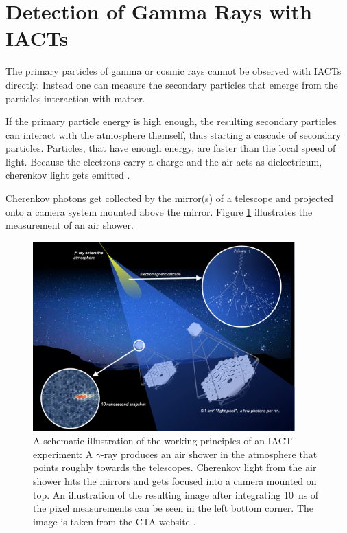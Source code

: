 \section{Detection of Gamma Rays with IACTs}
\label{sec:measuring}

The primary particles of gamma or cosmic rays cannot be 
observed with IACTs directly. Instead one can measure the secondary particles
that emerge from the particles interaction with matter.

If the primary particle energy is high enough, the resulting 
secondary particles can interact with the atmosphere themself, thus starting a 
cascade of secondary particles.
Particles, that have enough energy, are faster than the local speed of light.
Because the electrons carry a charge and the air acts as dielectricum, 
cherenkov light gets emitted \cite{quelle suchen}.

Cherenkov photons get collected by the mirror(s) of a telescope
and projected onto a camera system mounted above the mirror.
Figure \ref{fig:iact_mirror_camera} illustrates the measurement of 
an air shower.

\begin{figure}
	\centering
	\captionsetup{width=0.9\linewidth}
	\includegraphics[width=0.9\textwidth]{images/cta47.png}
	\caption{A schematic illustration of the working principles of 
	an IACT experiment:
	A $\gamma$-ray produces an air shower in the atmosphere
	that points roughly towards the telescopes.
	Cherenkov light from the air shower 
	hits the mirrors and gets focused into a camera mounted on top.
	An illustration of the resulting image after integrating 
	\SI{10}{\nano\second} of the pixel measurements
	can be seen in the left bottom corner.
	The image is taken from the CTA-website \cite{cta_web}.}
	\label{fig:iact_mirror_camera}
\end{figure}

